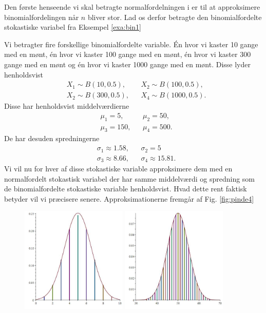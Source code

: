 Den første henseende vi skal betragte normalfordelningen i er til at approksimere binomialfordelingen når $n$ bliver stor. Lad os derfor betragte den binomialfordelte stokastiske variabel fra Eksempel \ref{exa:bin1}
\begin{exa}
	Vi betragter fire forskellige binomialfordelte variable. Én hvor vi kaster 10 gange med en mønt, én hvor vi kaster 100 gange med en mønt, én hvor vi kaster 300 gange med en mønt og én hvor vi kaster 
	1000 gange med en mønt. Disse lyder henholdsvist
	\begin{align*}
		&X_1 \sim B(10,0.5), &&X_2 \sim B(100,0.5),\\
		&X_2 \sim B(300,0.5), &&X_4 \sim B(1000,0.5).
	\end{align*}
	Disse har henholdsvist middelværdierne
	\begin{align*}
		&\mu_1 = 5, &&\mu_2 = 50, \\
		&\mu_3 = 150, &&\mu_4 = 500. 
	\end{align*}
	De har desuden spredningerne
	\begin{align*}
		&\sigma_1 \approx 1.58, && \sigma_2 = 5\\
		&\sigma_3 \approx 8.66, && \sigma_4 \approx 15.81.
	\end{align*}
	Vi vil nu for hver af disse stokastiske variable approksimere dem med en normalfordelt stokastisk variabel der har samme middelværdi og spredning som de binomialfordelte stokastiske variable 
	henholdsvist. Hvad dette rent faktisk betyder vil vi præcisere senere. 
	Approksimationerne fremgår af Fig. \ref{fig:pinde4}
	\begin{figure}[H]
		\center
		\includegraphics[width=0.45\textwidth]{Billeder/binompinde10}
		\includegraphics[width=0.45\textwidth]{Billeder/binompinde100}

\end{figure}
\end{exa}
